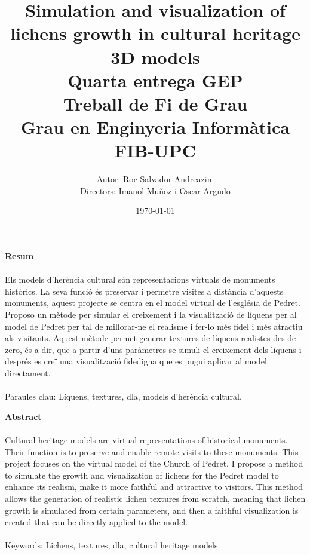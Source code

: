 \documentclass{article}
\title{\bfseries Simulation and visualization of lichens growth in cultural heritage 3D models \normalfont \vspace{0.3cm} \\ \large Quarta entrega GEP \\ \vspace{1cm} Treball de Fi de Grau \\ \vspace{0.3cm} Grau en Enginyeria Informàtica FIB-UPC \vspace{10cm}}
\author{Autor: Roc Salvador Andreazini \\ Directors: Imanol Muñoz i Oscar Argudo}
\date{\today}
\begin{document}


\newpage

\textbf{\large Resum}

\paragraph{} Els models d'herència cultural són representacions virtuals de monuments històrics. La seva funció és preservar i permetre visites a distància d'aquests monuments, aquest projecte se centra en el model virtual de l'església de Pedret. Proposo un mètode per simular el creixement i la visualització de líquens per al model de Pedret per tal de millorar-ne el realisme i fer-lo més fidel i més atractiu als visitants. Aquest mètode permet generar textures de líquens realistes des de zero, és a dir, que a partir d'uns paràmetres se simuli el creixement dels líquens i després es creï una visualització fidedigna que es pugui aplicar al model directament.

\paragraph{} Paraules clau: Líquens, textures, dla, models d'herència cultural.

\newpage

\textbf{\large Abstract}

\paragraph{} Cultural heritage models are virtual representations of historical monuments. Their function is to preserve and enable remote visits to these monuments. This project focuses on the virtual model of the Church of Pedret. I propose a method to simulate the growth and visualization of lichens for the Pedret model to enhance its realism, make it more faithful and attractive to visitors. This method allows the generation of realistic lichen textures from scratch, meaning that lichen growth is simulated from certain parameters, and then a faithful visualization is created that can be directly applied to the model.

\paragraph{} Keywords: Lichens, textures, dla, cultural heritage models.

\newpage
\end{document}
